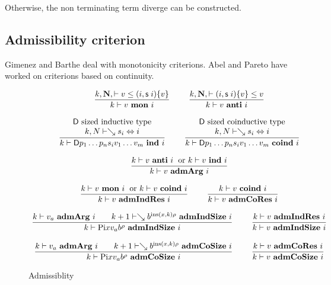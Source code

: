 Otherwise, the non terminating term diverge can be constructed.

\subsection{Admissibility criterion}
Gimenez and Barthe deal with monotonicity criterions.
Abel and Pareto have worked on criterions based on continuity.

\newcommand{\mon}[3]{#1\vdash#2\mbox{ \textbf{mon} }#3}
\newcommand{\anti}[3]{#1\vdash#2\mbox{ \textbf{anti} }#3}
\newcommand{\indu}[3]{#1\vdash#2\mbox{ \textbf{ind} }#3}
\newcommand{\coind}[3]{#1\vdash#2\mbox{ \textbf{coind} }#3}
\newcommand{\admIndSize}[3]{#1\vdash#2\mbox{ \textbf{admIndSize} }#3}
\newcommand{\admCoSize}[3]{#1\vdash#2\mbox{ \textbf{admCoSize} }#3}
\newcommand{\admArg}[3]{#1\vdash#2\mbox{ \textbf{admArg} }#3}
\newcommand{\admIndRes}[3]{#1\vdash#2\mbox{ \textbf{admIndRes} }#3}
\newcommand{\admCoRes}[3]{#1\vdash#2\mbox{ \textbf{admCoRes} }#3}

\begin{figure}
\begin{gather*}
\nru{}
{\LeqVal{k}{\nF}{v}{\subst{(i,\s i)}{v}}}
{\mon{k}{v}{i}}
\qquad
\nru{}
{\LeqVal{k}{\nF}{\subst{(i,\s i)}{v}}{v}}
{\anti{k}{v}{i}}
\\[2ex]
\ndru{}
{\DD \mbox{ sized inductive type}}
{\EqVal{k}{N}{\wh s_i}{i}}
{\indu{k}{\DD p_1 \ldots p_n s_i v_1 \ldots v_m}{i}}
\qquad
\ndru{}
{\DD \mbox{ sized coinductive type}}
{\EqVal{k}{N}{\wh s_i}{i}}
{\coind{k}{\DD p_1 \ldots p_n s_i v_1 \ldots v_m}{i}}
\\[2ex]
\nru{}
{\anti{k}{v}{i} \; \mbox{ or } \indu{k}{v}{i}}
{\admArg{k}{v}{i}}
\\[2ex]
\nru{}
{\mon{k}{v}{i} \; \mbox{ or } \coind{k}{v}{i}}
{\admIndRes{k}{v}{i}}
\qquad
\nru{}
{\coind{k}{v}{i}}
{\admCoRes{k}{v}{i}}
\\[2ex]
\nru{}
{\admArg{k}{v_a}{i} 
\qquad
{\admIndSize{k+1}{\wh \cl{b}{\ins (x,k) \rho}}{i}}}
{\admIndSize{k}{\vpi x v_a \cl{b}{\rho}}{i}}
\qquad
\nru{}
{\admIndRes{k}{v}{i}}
{\admIndSize{k}{v}{i}}
\\[2ex]
\nru{}
{\admArg{k}{v_a}{i} 
\qquad
{\admCoSize{k+1}{\wh \cl{b}{\ins (x,k) \rho}}{i}}}
{\admCoSize{k}{\vpi x v_a \cl{b}{\rho}}{i}}
\qquad
\nru{}
{\admCoRes{k}{v}{i}}
{\admCoSize{k}{v}{i}}
\end{gather*}
\caption{Admissiblity}
\end{figure}


